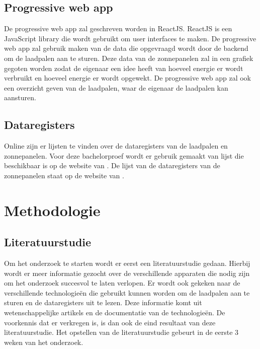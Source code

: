 \subsection{Progressive web app}%
\label{sub:progressive_web_app}
De progressive web app zal geschreven worden in ReactJS. ReactJS is een JavaScript library die wordt gebruikt om user interfaces te maken. De progressive web app zal gebruik maken van de data die opgevraagd wordt door de backend om de laadpalen aan te sturen. Deze data van de zonnepanelen zal in een grafiek gegoten worden zodat de eigenaar een idee heeft van hoeveel energie er wordt verbruikt en hoeveel energie er wordt opgewekt. De progressive web app zal ook een overzicht geven van de laadpalen, waar de eigenaar de laadpalen kan aansturen.

\subsection{Dataregisters}%
\label{sub:dataregisters}
Online zijn er lijsten te vinden over de dataregisters van de laadpalen en zonnepanelen. Voor deze bachelorproef wordt er gebruik gemaakt van lijst die beschikbaar is op de website van \textcite{Alfen2020}. De lijst van de dataregisters van de zonnepanelen staat op de website van \textcite{solarinverters2016}.


\section{Methodologie}%
\label{sec:methodologie}

\subsection{Literatuurstudie}%
\label{sub:literatuurstudie_methodologie}
Om het onderzoek te starten wordt er eerst een literatuurstudie gedaan. Hierbij wordt er meer informatie gezocht over de verschillende apparaten die nodig zijn om het onderzoek succesvol te laten verlopen. Er wordt ook gekeken naar de verschillende technologieën die gebruikt kunnen worden om de laadpalen aan te sturen en de dataregisters uit te lezen. Deze informatie komt uit wetenschappelijke artikels en de documentatie van de technologieën. De voorkennis dat er verkregen is, is dan ook de eind resultaat van deze literatuurstudie. Het opstellen van de literatuurstudie gebeurt in de eerste 3 weken van het onderzoek.

